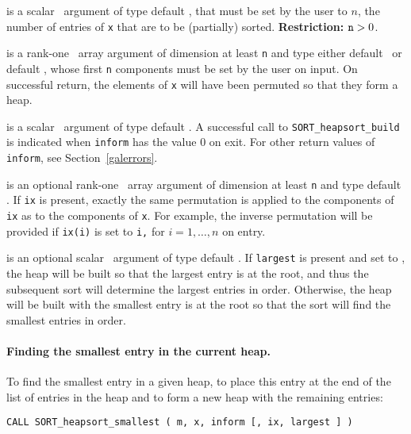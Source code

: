 \documentclass{galahad}
\newcommand{\packagename}{SORT}
\begin{document}
\vspace*{-3mm}
\begin{description}
 is a scalar \intentin\ argument of type default
\integer, that must be set by the user to $n$, the
number of entries of {\tt x} that are to be (partially) sorted.
{\bf Restriction:} ${\tt n} > 0$.

 is a rank-one \intentinout\ array argument of
dimension at least {\tt n} and type either default
\integer\ or default \realdp, whose first {\tt n} components  must be set by
the user on input. On successful return, the elements of {\tt x} will have
been permuted so that they form a heap.

 is a scalar \intentout\ argument of type default \integer.
A successful call to {\tt \packagename\_heapsort\_build}
is indicated when {\tt inform} has the value 0 on exit.
For other return values of {\tt inform}, see Section~\ref{galerrors}.

 is an optional rank-one \intentinout\ array argument of
dimension at least {\tt n} and type default \integer.
If {\tt ix} is present, exactly the same permutation is applied to the
components of {\tt ix} as to the components of {\tt x}.
For example, the inverse permutation will be
provided if {\tt ix(i)} is set to {\tt i,} for $i = 1, \ldots, n$
on entry.

 is an optional scalar \intentin\ argument
of type default \integer.
If {\tt largest} is present and set to \true, the heap will be built so
that the largest entry is at the root, and thus the subsequent sort will
determine the largest entries in order. Otherwise, the heap will be
built with the smallest entry is at the root so that the sort will
find the smallest entries in order.
\end{description}


\paragraph{Finding the smallest entry in the current heap.}

To find the smallest entry in a given heap,
to place this entry at the end of the list of entries in the heap and
to form a new heap with the remaining entries:

\hspace{8mm}
{\tt CALL \packagename\_heapsort\_smallest ( m, x, inform [, ix, largest ] )}
\end{document}
